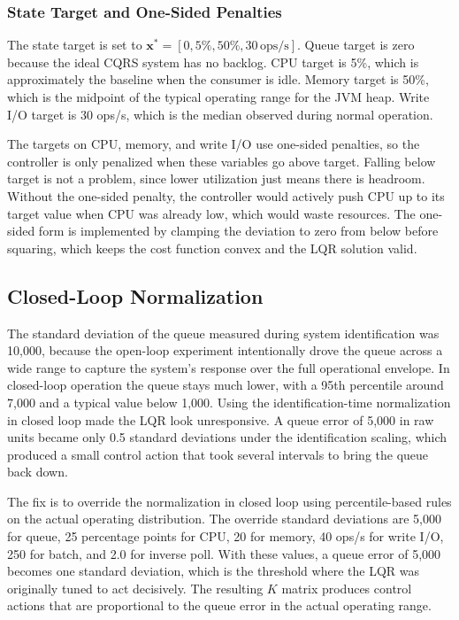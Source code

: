 \documentclass[10pt,a4paper]{article}
\begin{document}
\subsubsection{State Target and One-Sided Penalties}

The state target is set to $\mathbf{x}^* = [0, 5\%, 50\%, 30\,\text{ops/s}]$. Queue target is zero because the ideal CQRS system has no backlog. CPU target is 5\%, which is approximately the baseline when the consumer is idle. Memory target is 50\%, which is the midpoint of the typical operating range for the JVM heap. Write I/O target is 30 ops/s, which is the median observed during normal operation.

The targets on CPU, memory, and write I/O use one-sided penalties, so the controller is only penalized when these variables go above target. Falling below target is not a problem, since lower utilization just means there is headroom. Without the one-sided penalty, the controller would actively push CPU up to its target value when CPU was already low, which would waste resources. The one-sided form is implemented by clamping the deviation to zero from below before squaring, which keeps the cost function convex and the LQR solution valid.

\subsection{Closed-Loop Normalization}

The standard deviation of the queue measured during system identification was 10{,}000, because the open-loop experiment intentionally drove the queue across a wide range to capture the system's response over the full operational envelope. In closed-loop operation the queue stays much lower, with a 95th percentile around 7{,}000 and a typical value below 1{,}000. Using the identification-time normalization in closed loop made the LQR look unresponsive. A queue error of 5{,}000 in raw units became only 0.5 standard deviations under the identification scaling, which produced a small control action that took several intervals to bring the queue back down.

The fix is to override the normalization in closed loop using percentile-based rules on the actual operating distribution. The override standard deviations are 5{,}000 for queue, 25 percentage points for CPU, 20 for memory, 40 ops/s for write I/O, 250 for batch, and 2.0 for inverse poll. With these values, a queue error of 5{,}000 becomes one standard deviation, which is the threshold where the LQR was originally tuned to act decisively. The resulting $K$ matrix produces control actions that are proportional to the queue error in the actual operating range.
\end{document}
